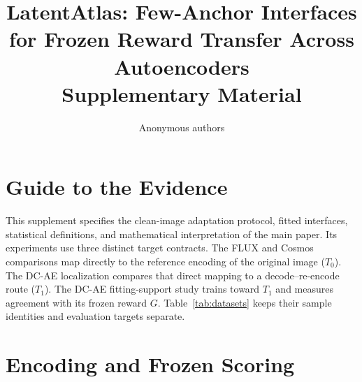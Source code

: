 \documentclass[10pt,twocolumn,letterpaper]{article}
\title{LatentAtlas: Few-Anchor Interfaces for Frozen Reward Transfer Across Autoencoders\\Supplementary Material}
\author{Anonymous authors}
\begin{document}
\maketitle
\setcounter{section}{0}

\section{Guide to the Evidence}
This supplement specifies the clean-image adaptation protocol, fitted interfaces, statistical definitions, and mathematical interpretation of the main paper. Its experiments use three distinct target contracts. The FLUX and Cosmos comparisons map directly to the reference encoding of the original image ($T_0$). The DC-AE localization compares that direct mapping to a decode--re-encode route ($T_1$). The DC-AE fitting-support study trains toward $T_1$ and measures agreement with its frozen reward $G$. Table~\ref{tab:datasets} keeps their sample identities and evaluation targets separate.

\begin{table}[t]\centering\small
{}
\caption{Experiment identities. Each physical pair has four fixed scoring streams. The 56 groups are disjoint from the 28 adapter development groups; their parent pool had already been used for source qualification.}
\label{tab:datasets}\end{table}

\section{Encoding and Frozen Scoring}
\end{document}

